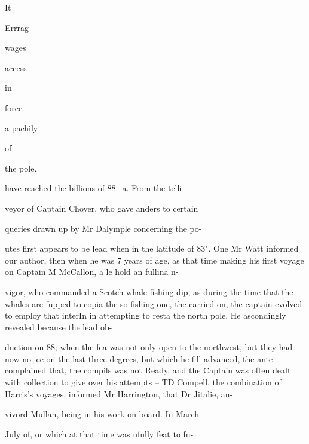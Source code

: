 \documentclass{article}
\begin{document}
It

Errrag-

wages

access

in

force

a pachily

of

the pole.

have reached the billions of 88.--a. From the telli-

veyor of Captain Choyer, who gave anders to certain

queries drawn up by Mr Dalymple concerning the po-

utes first appears to be lead when in the latitude of 83". One Mr Watt informed our author, then when he was 7 years of age, as that time making his first voyage on Captain M McCallon, a le hold an fullina n-

vigor, who commanded a Scotch whale-fishing dip, as during the time that the whales are fupped to copia the so fishing one, the carried on, the captain evolved to employ that interIn in attempting to resta the north pole. He ascondingly revealed because the lead ob-

duction on 88; when the fea was not only open to the northwest, but they had now no ice on the last three degrees, but which he fill advanced, the ante complained that, the compils was not Ready, and the Captain was often dealt with collection to give over his attempts – TD Compell, the combination of Harris’s voyages, informed Mr Harrington, that Dr Jitalie, an-

vivord Mullan, being in his work on board. In March

July of, or which at that time was ufully feat to fu-
\end{document}
